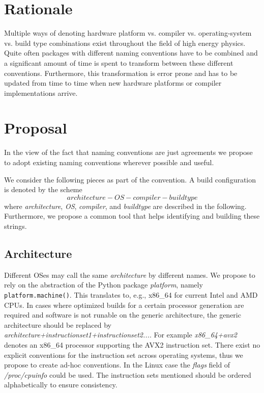 \documentclass[12pt,a4paper]{article}
\begin{document}
\pagestyle{plain} %
\setcounter{page}{1}

\section{Rationale}

Multiple ways of denoting hardware platform vs. compiler vs. operating-system vs. build type combinations exist throughout the field of high energy physics. Quite often packages with different naming conventions have to be combined and a significant amount of time is spent to transform between these different conventions. Furthermore, this transformation is error prone and has to be updated from time to time when new hardware platforms or compiler implementations arrive.

\section{Proposal}

In the view of the fact that naming conventions are just agreements we propose to adopt existing naming conventions wherever possible and useful.

We consider the following pieces as part of the convention. A build configuration is denoted by the scheme
\[architecture-OS-compiler-buildtype\]
where \emph{architecture}, \emph{OS}, \emph{compiler}, and \emph{buildtype} are described in the following. Furthermore, we propose a common tool that helps identifying and building these strings. 

\subsection{Architecture}

Different OSes may call the same \emph{architecture} by different names. We propose to rely on the abstraction of the Python package \emph{platform}, namely \texttt{platform.machine()}. This translates to, e.g., x86\_64 for current Intel and AMD CPUs. In cases where optimized builds for a certain processor generation are required and software is not runable on the generic architecture, the generic architecture should be replaced by \emph{architecture+instructionset1+instructionset2...}. For example \emph{x86\_64+avx2} denotes an x86\_64 processor supporting the AVX2 instruction set.
There exist no explicit conventions for the instruction set across operating systems, thus we propose to create ad-hoc conventions. In the Linux case the \emph{flags} field of \emph{/proc/cpuinfo} could be used. The instruction sets mentioned should be ordered alphabetically to ensure consistency.
\end{document}
